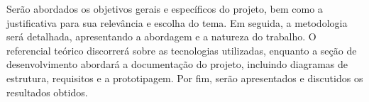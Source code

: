 Serão abordados os objetivos gerais e específicos do projeto, bem como a justificativa para sua relevância e escolha do tema. Em seguida, a metodologia será detalhada, apresentando a abordagem e a natureza do trabalho. O referencial teórico discorrerá sobre as tecnologias utilizadas, enquanto a seção de desenvolvimento abordará a documentação do projeto, incluindo diagramas de estrutura, requisitos e a prototipagem. Por fim, serão apresentados e discutidos os resultados obtidos.
